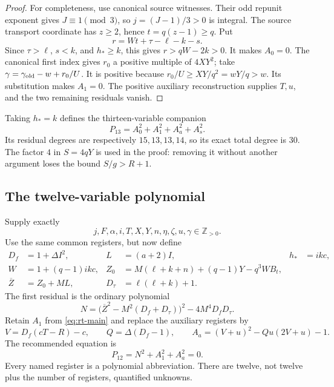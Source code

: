 \begin{proof}
For completeness, use canonical source witnesses.  Their odd repunit
exponent gives $J\equiv1\pmod3$, so $j=(J-1)/3>0$ is integral.
The source transport coordinate has $z\ge2$, hence
$t=q(z-1)\ge q$.  Put
\[
 r=Wt+\tau-\ell-k-s.
\]
Since $\tau>\ell$, $s<k$, and $h_*\ge k$, this gives
$r>qW-2k>0$.  It makes $A_0=0$.
The canonical first index gives $r_0$ a positive multiple of $4XY^2$;
take $\gamma=\gamma_{\rm old}-w+r_0/U$.
It is positive because
$r_0/U\ge XY/q^2=wY/q>w$.  Its substitution makes $A_1=0$.
The positive auxiliary reconstruction supplies $T,u$, and the two
remaining residuals vanish.
\end{proof}

Taking $h_*=k$ defines the thirteen-variable companion
\[
 P_{13}=A_0^2+A_1^2+A_a^2+A_s^2.
\]
Its residual degrees are respectively $15,13,13,14$, so its exact total
degree is $30$.  The factor $4$ in $S=4qY$ is used in the proof:
removing it without another argument loses the bound $S/g>R+1$.

\subsection{The twelve-variable polynomial}

Supply exactly
\[
 j,F,\alpha,i,T,X,Y,n,\eta,\zeta,u,\gamma\in\mathbb Z_{>0}.
\]
Use the same common registers, but now define
\begin{align}
 D_f&=1+\Delta I^2,& L&=(a+2)I,& h_*&=ikc,\nonumber\\
 W&=1+(q-1)ikc,&
 Z_0&=M(\ell+k+n)+(q-1)Y-q^3WB_t,\label{eq:rt-newregs}\\
 \overline Z&=Z_0+ML,& D_\tau&=\ell(\ell+k)+1.\nonumber
\end{align}
The first residual is the ordinary polynomial
\begin{equation}
 N=\bigl(\overline Z^2-M^2(D_f+D_\tau)\bigr)^2
                  -4M^4D_fD_\tau.\label{eq:rt-N}
\end{equation}
Retain $A_1$ from \eqref{eq:rt-main} and replace the auxiliary registers by
\begin{equation}
 V=D_f(cT-R)-c,\qquad Q=\Delta(D_f-1),\qquad
 A_a=(V+u)^2-Qu(2V+u)-1.\label{eq:rt-newaux}
\end{equation}
The recommended equation is
\begin{equation}
 \boxed{P_{12}=N^2+A_1^2+A_a^2=0.}\label{eq:rt-P12}
\end{equation}
Every named register is a polynomial abbreviation.  There are twelve,
not twelve plus the number of registers, quantified unknowns.

